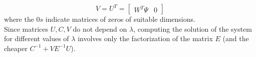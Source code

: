 \begin{equation*}
    V = U^T =
    \begin{bmatrix}
        W^T\Psi & 0
    \end{bmatrix}
\end{equation*}
where the $0s$ indicate matrices of zeros of suitable dimensions.\\
Since matrices $U, C, V$ do not depend on $\lambda$, computing the solution of the system for different values of $\lambda$ involves only the factorization of the matrix $E$ (and the cheaper $C^{-1} + V E^{-1}U$).